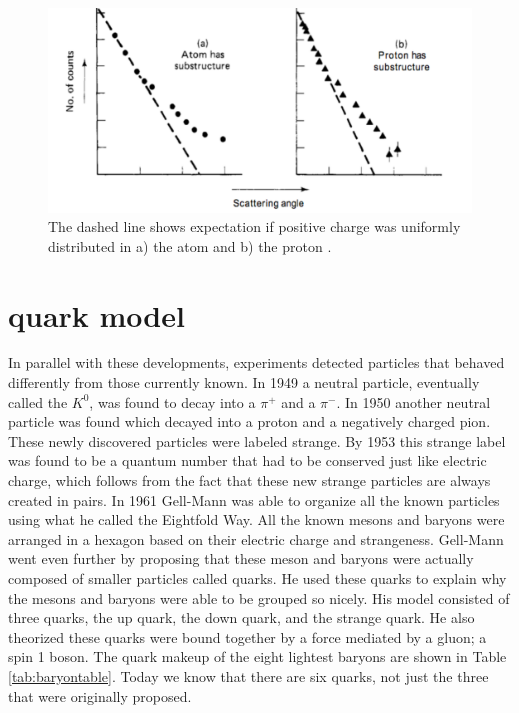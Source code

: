 \documentclass[letterpaper, abstract = on,listof=totoc, bibliography=totoc]{scrreprt}
\begin{document}
\begin{figure}
\begin{center}
\includegraphics[width = .6\textwidth]{protonSubstructureScattering}
\caption[Scattering at SLAC shows proton substructure]{The dashed line shows expectation if positive charge was uniformly distributed in a) the atom and b) the proton \cite{IEP}.}
\label{fig:protonSubstructureScattering}
\end{center}
\end{figure}





\section{quark model}

In parallel with these developments, experiments detected particles that behaved differently from those currently known. In 1949 a neutral particle, eventually called the $K^0$, was found to decay into a $\pi^+$ and a $\pi^-$. In 1950 another neutral particle was found which decayed into a proton and a negatively charged pion. These newly discovered particles were labeled strange. By 1953 this strange label was found to be a quantum number that had to be conserved just like electric charge, which follows from the fact that these new strange particles are always created in pairs. In 1961 Gell-Mann was able to organize all the known particles using what he called the Eightfold Way. All the known mesons and baryons were arranged in a hexagon based on their electric charge and strangeness.  Gell-Mann went even further by proposing that these meson and baryons were actually composed of smaller particles called quarks. He used these quarks to explain why the mesons and baryons were able to be grouped so nicely. His model consisted of three quarks, the up quark, the down quark, and the strange quark. He also theorized these quarks were bound together by a force mediated by a gluon; a spin 1 boson. The quark makeup of the eight lightest baryons are shown in Table \ref{tab:baryontable}. Today we know that there are six quarks, not just the three that were originally proposed. 
\end{document}
